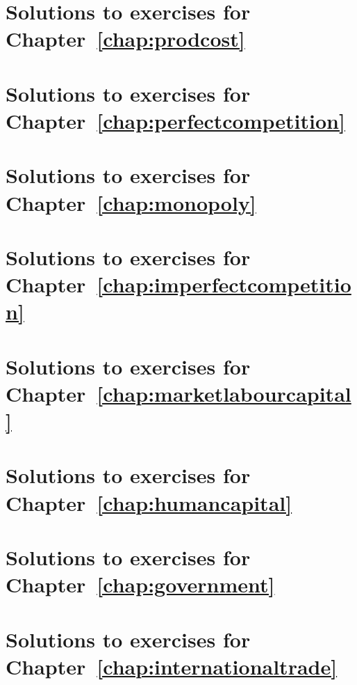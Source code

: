 	\newpage
	\section*{Solutions to exercises for Chapter~\ref{chap:prodcost}}
	
	
	\newpage
	\section*{Solutions to exercises for Chapter~\ref{chap:perfectcompetition}}
	
	
	\newpage
	\section*{Solutions to exercises for Chapter~\ref{chap:monopoly}}
	
	
	\newpage
	\section*{Solutions to exercises for Chapter~\ref{chap:imperfectcompetition}}
	
	
	\newpage
	\section*{Solutions to exercises for Chapter~\ref{chap:marketlabourcapital}}
	
	
	\newpage
	\section*{Solutions to exercises for Chapter~\ref{chap:humancapital}}
	
	
	\newpage
	\section*{Solutions to exercises for Chapter~\ref{chap:government}}
	
	
	\newpage
	\section*{Solutions to exercises for Chapter~\ref{chap:internationaltrade}}
	